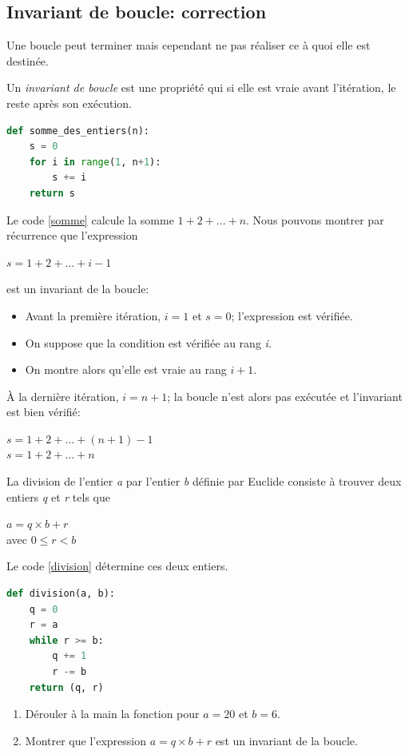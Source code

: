 \documentclass[a4paper,11pt]{article}
\begin{document}
\begin{Form}
\section{Invariant de boucle: correction}
Une boucle peut terminer mais cependant ne pas réaliser ce à quoi elle est destinée.
\begin{aretenir}[]
Un \emph{invariant de boucle} est une propriété qui si elle est vraie avant l'itération, le reste après son exécution.
\end{aretenir}
\begin{center}
\begin{lstlisting}[language=Python]
def somme_des_entiers(n):
    s = 0
    for i in range(1, n+1):
        s += i
    return s
\end{lstlisting}
\label{somme}
\end{center}
Le code \ref{somme} calcule la somme $1+2+...+n$. Nous pouvons montrer par récurrence que l'expression \begin{center}
$s=1+2+...+i-1$
\end{center} est un invariant de la boucle:
\begin{itemize}
\item Avant la première itération, $i=1$ et $s=0$; l'expression est vérifiée.
\item On suppose que la condition est vérifiée au rang \emph{i}.
\item On montre alors qu'elle est vraie au rang $i+1$.
\end{itemize}
\begin{aretenir}[Remarque]
À la dernière itération, $i=n+1$; la boucle n'est alors pas exécutée et l'invariant est bien vérifié:
\begin{center}
$s=1+2+...+(n+1)-1$
\\$s=1+2+...+n$
\end{center}
\end{aretenir}
\begin{activite}
La division de l'entier \emph{a} par l'entier \emph{b} définie par Euclide consiste à trouver deux entiers \emph{q} et \emph{r} tels que 
\begin{center}
$a=q×b+r$
\\avec $0\leq r <b$
\end{center}
Le code \ref{division} détermine ces deux entiers.
\begin{center}
\begin{lstlisting}[language=Python]
def division(a, b):
    q = 0
    r = a
    while r >= b:
        q += 1
        r -= b
    return (q, r)
\end{lstlisting}
\label{division}
\end{center}
\begin{enumerate}
\item Dérouler à la main la fonction pour $a=20$ et $b=6$.
\item Montrer que l'expression $a=q×b+r$ est un invariant de la boucle.
\end{enumerate}
\end{activite}

\end{Form}
\end{document}
